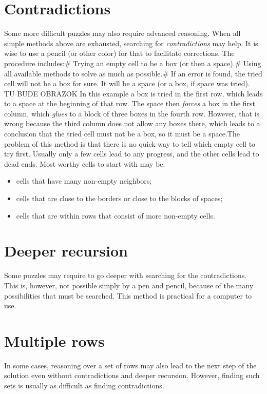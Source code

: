 {{\section{Contradictions}
Some more difficult puzzles may also require advanced reasoning. When all simple methods above are exhausted, searching for \textit{contradictions} may help. It is wise to use a pencil (or other color) for that to facilitate corrections. The procedure includes:# Trying an empty cell to be a box (or then a space).# Using all available methods to solve as much as possible.# If an error is found, the tried cell will not be a box for sure. It will be a space (or a box, if space was tried).
TU BUDE OBRAZOK
In this example a box is tried in the first row, which leads to a space at the beginning of that row. The space then \textit{forces} a box in the first column, which \textit{glues} to a block of three boxes in the fourth row. However, that is wrong because the third column does not allow any boxes there, which leads to a conclusion that the tried cell must not be a box, so it must be a space.The problem of this method is that there is no quick way to tell which empty cell to try first. Usually only a few cells lead to any progress, and the other cells lead to dead ends. Most worthy cells to start with may be:
\begin{itemize} \item {cells that have many non-empty neighbors;}\item {cells that are close to the borders or close to the blocks of spaces;}\item {cells that are within rows that consist of more non-empty cells.} \end{itemize}

\section{Deeper recursion}
Some puzzles may require to go deeper with searching for the contradictions. This is, however, not possible simply by a pen and pencil, because of the many possibilities that must be searched. This method is practical for a computer to use.
\section{Multiple rows}
In some cases, reasoning over a set of rows may also lead to the next step of the solution even without contradictions and deeper recursion. However, finding such sets is usually as difficult as finding contradictions.
}}
